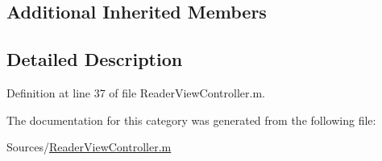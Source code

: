 \subsection*{Additional Inherited Members}


\subsection{Detailed Description}


Definition at line 37 of file Reader\-View\-Controller.\-m.



The documentation for this category was generated from the following file\-:\begin{DoxyCompactItemize}
\item 
Sources/\hyperlink{_reader_view_controller_8m}{Reader\-View\-Controller.\-m}\end{DoxyCompactItemize}
